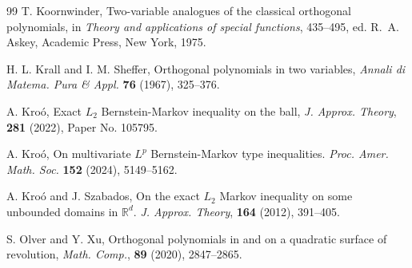 \documentclass{amsart}
\theoremstyle{remark}
\def\RR{{\mathbb R}}
\begin{document}
\begin{thebibliography}{99}
        T. Koornwinder, 
        Two-variable analogues of the classical orthogonal polynomials, in 
	\textit{Theory and applications of special functions}, 435--495,  
        ed. R.~A. Askey, Academic Press, New York, 1975.

        H. L. Krall and I. M. Sheffer, 
        Orthogonal polynomials in two variables,
        \textit{Annali di Matema. Pura \& Appl.} \textbf{76} (1967), 325--376.
           

        A. Kro\'o, 
        Exact $L_2$ Bernstein-Markov inequality on the ball, 
        \textit{J. Approx. Theory}, \textbf{281} (2022), Paper No. 105795.         
    
        A. Kro\'o, On multivariate $L^p$ Bernstein-Markov type inequalities. 
        \textit{Proc. Amer. Math. Soc.} \textbf{152} (2024), 5149--5162. 


        A. Kro\'o and J. Szabados, 
        On the exact $L_2$ Markov inequality on some unbounded domains in $\RR^d$. 
        \textit{J. Approx. Theory}, \textbf{164} (2012), 391--405.  
        
       
       S. Olver and Y. Xu,
       Orthogonal polynomials in and on a quadratic surface of revolution, 
       \textit{Math. Comp.}, {\bf 89} (2020), 2847--2865.

 

\end{thebibliography}
\end{document}
